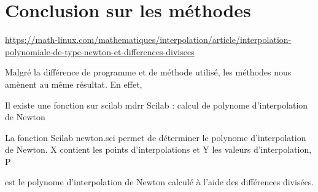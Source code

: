\documentclass[letter]{article}
\begin{document}
\section{Conclusion sur les méthodes}
\label{sec:orgdf8850a}


\url{https://math-linux.com/mathematiques/interpolation/article/interpolation-polynomiale-de-type-newton-et-differences-divisees}

Malgré la différence de programme et de méthode utilisé, les méthodes nous amènent au même résultat. En effet, 


Il existe une fonction sur scilab mdrr
Scilab : calcul de polynome d’interpolation de Newton

La fonction Scilab newton.sci permet de déterminer le polynome d’interpolation de Newton. X
contient les points d’interpolations et Y les valeurs d’interpolation, P


est le polynome d’interpolation de Newton calculé à l’aide des différences divisées.
\end{document}
